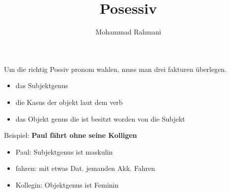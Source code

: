 \documentclass[a4paper]{article}
\title{Posessiv}
\date{}
\author{Mohammad Rahmani}
\begin{document}
    \maketitle
    Um die richtig Possiv pronom wahlen, muss man drei fakturen überlegen.
    \begin{itemize}
        \item das Subjektgenus
        \item die Kasus der objekt laut dem verb
        \item das Objekt genus die ist besitzt worden von die Subjekt
    \end{itemize}
    Beispiel: \textbf{Paul fährt ohne seine Kolligen}
    \begin{itemize}
        \item Paul: Subjektgenus ist maskulin
        \item fahren: mit etwas Dat. jemanden Akk. Fahren
        \item Kollegin: Objektgenus ist Feminin
    \end{itemize}
    
    
\end{document}
